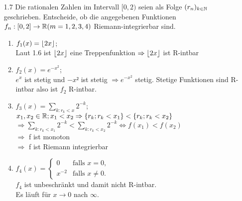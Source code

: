 \documentclass{HM}
\begin{document}
\begin{enumerate}
		\item[1.7] Die rationalen Zahlen im Intervall $[0,2)$ seien als Folge $(r_n)_{k\in\mathbb{N}}$ geschrieben. Entscheide, ob die angegebenen Funktionen $f_n:[0,2]\to\mathbb{R}(m=1,2,3,4)$ Riemann-integrierbar sind.
		\begin{enumerate}
			\item $f_1(x)=\lfloor2x\rfloor$;\\
			Laut 1.6 ist $\lfloor2x\rfloor$ eine Treppenfunktion $\Rightarrow \lfloor2x\rfloor$ ist R-intbar\\

			\item $f_2(x)=e^{-x^{2}}$;\\
			$e^x$ ist stetig und $-x²$ ist stetig $\Rightarrow e^{-x^2}$ stetig. Stetige Funktionen sind R-intbar also ist $f_2$ R-intbar. \\

			\item $f_3(x)=\sum\limits_{k:r_k<x}2^{-k}$;\\
			
			$x_1,x_2\in\mathbb{R}; x_1<x_2 \Rightarrow \{r_
			k; r_k<x_1\}<\{r_k;r_k<x_2\}$\\
			$\Rightarrow \sum\limits_{k:r_k<x_1}2^{-k}<\sum\limits_{k:r_k<x_2}2^{-k}\Leftrightarrow f(x_1)<f(x_2)$\\
			$\Rightarrow$ f ist monoton\\
			$\Rightarrow$ f ist Riemann integrierbar

			\item $f_4(x)=\begin{cases}
				0&\text{falls }x=0,\\
				x^{-2}&\text{falls }x\neq 0.
			\end{cases}$\\
		
			$f_4$ ist unbeschränkt und damit nicht R-intbar.\\
			Es läuft für $x\to0$ nach $\infty$.
		\end{enumerate}


\end{enumerate}
\end{document}
